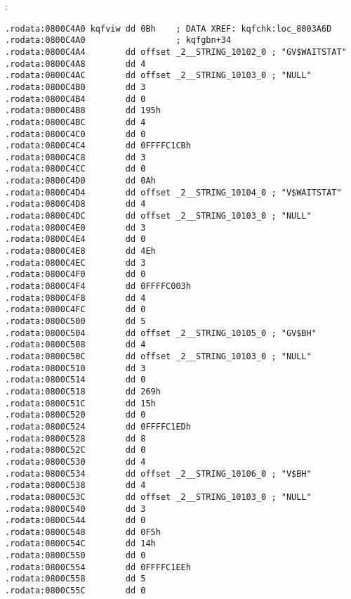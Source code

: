
:

\begin{lstlisting}[caption=kqf.o]
.rodata:0800C4A0 kqfviw dd 0Bh    ; DATA XREF: kqfchk:loc_8003A6D
.rodata:0800C4A0                  ; kqfgbn+34
.rodata:0800C4A4        dd offset _2__STRING_10102_0 ; "GV$WAITSTAT"
.rodata:0800C4A8        dd 4
.rodata:0800C4AC        dd offset _2__STRING_10103_0 ; "NULL"
.rodata:0800C4B0        dd 3
.rodata:0800C4B4        dd 0
.rodata:0800C4B8        dd 195h
.rodata:0800C4BC        dd 4
.rodata:0800C4C0        dd 0
.rodata:0800C4C4        dd 0FFFFC1CBh
.rodata:0800C4C8        dd 3
.rodata:0800C4CC        dd 0
.rodata:0800C4D0        dd 0Ah
.rodata:0800C4D4        dd offset _2__STRING_10104_0 ; "V$WAITSTAT"
.rodata:0800C4D8        dd 4
.rodata:0800C4DC        dd offset _2__STRING_10103_0 ; "NULL"
.rodata:0800C4E0        dd 3
.rodata:0800C4E4        dd 0
.rodata:0800C4E8        dd 4Eh
.rodata:0800C4EC        dd 3
.rodata:0800C4F0        dd 0
.rodata:0800C4F4        dd 0FFFFC003h
.rodata:0800C4F8        dd 4
.rodata:0800C4FC        dd 0
.rodata:0800C500        dd 5
.rodata:0800C504        dd offset _2__STRING_10105_0 ; "GV$BH"
.rodata:0800C508        dd 4
.rodata:0800C50C        dd offset _2__STRING_10103_0 ; "NULL"
.rodata:0800C510        dd 3
.rodata:0800C514        dd 0
.rodata:0800C518        dd 269h
.rodata:0800C51C        dd 15h
.rodata:0800C520        dd 0
.rodata:0800C524        dd 0FFFFC1EDh
.rodata:0800C528        dd 8
.rodata:0800C52C        dd 0
.rodata:0800C530        dd 4
.rodata:0800C534        dd offset _2__STRING_10106_0 ; "V$BH"
.rodata:0800C538        dd 4
.rodata:0800C53C        dd offset _2__STRING_10103_0 ; "NULL"
.rodata:0800C540        dd 3
.rodata:0800C544        dd 0
.rodata:0800C548        dd 0F5h
.rodata:0800C54C        dd 14h
.rodata:0800C550        dd 0
.rodata:0800C554        dd 0FFFFC1EEh
.rodata:0800C558        dd 5
.rodata:0800C55C        dd 0
\end{lstlisting}

